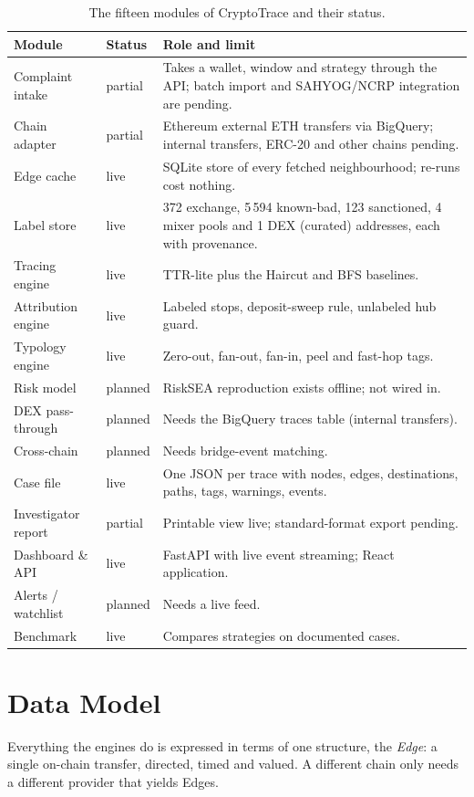 \begin{table}[H]
\centering\small\singlespacing
\begin{tabular}{p{3.2cm} p{2.1cm} p{7.6cm}}
\toprule
\textbf{Module} & \textbf{Status} & \textbf{Role and limit}\\
\midrule
Complaint intake & partial & Takes a wallet, window and strategy through the API; batch import and SAHYOG/NCRP integration are pending.\\
Chain adapter & partial & Ethereum external ETH transfers via BigQuery; internal transfers, ERC-20 and other chains pending.\\
Edge cache & live & SQLite store of every fetched neighbourhood; re-runs cost nothing.\\
Label store & live & 372 exchange, 5\,594 known-bad, 123 sanctioned, 4 mixer pools and 1 DEX (curated) addresses, each with provenance.\\
Tracing engine & live & TTR-lite plus the Haircut and BFS baselines.\\
Attribution engine & live & Labeled stops, deposit-sweep rule, unlabeled hub guard.\\
Typology engine & live & Zero-out, fan-out, fan-in, peel and fast-hop tags.\\
Risk model & planned & RiskSEA reproduction exists offline; not wired in.\\
DEX pass-through & planned & Needs the BigQuery traces table (internal transfers).\\
Cross-chain & planned & Needs bridge-event matching.\\
Case file & live & One JSON per trace with nodes, edges, destinations, paths, tags, warnings, events.\\
Investigator report & partial & Printable view live; standard-format export pending.\\
Dashboard \& API & live & FastAPI with live event streaming; React application.\\
Alerts / watchlist & planned & Needs a live feed.\\
Benchmark & live & Compares strategies on documented cases.\\
\bottomrule
\end{tabular}
\caption{The fifteen modules of CryptoTrace and their status.}
\label{tab:modules}
\end{table}

\section{Data Model}
Everything the engines do is expressed in terms of one structure, the \emph{Edge}: a single on-chain transfer, directed, timed and valued. A different chain only needs a different provider that yields Edges.

